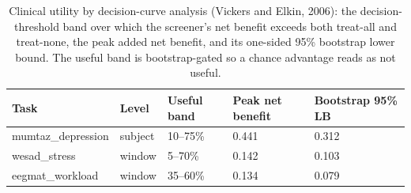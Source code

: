 \begin{table}[t]
\centering
\footnotesize
\caption{Clinical utility by decision-curve analysis (Vickers and Elkin, 2006): the decision-threshold band over which the screener's net benefit exceeds both treat-all and treat-none, the peak added net benefit, and its one-sided 95\% bootstrap lower bound. The useful band is bootstrap-gated so a chance advantage reads as not useful.}
\label{tab:utility}
\begin{tabular}{lllll}
\toprule
Task & Level & Useful band & Peak net benefit & Bootstrap 95\% LB \\
\midrule
mumtaz\_depression & subject & 10--75\% & 0.441 & 0.312 \\
wesad\_stress & window & 5--70\% & 0.142 & 0.103 \\
eegmat\_workload & window & 35--60\% & 0.134 & 0.079 \\
\bottomrule
\end{tabular}
\end{table}
